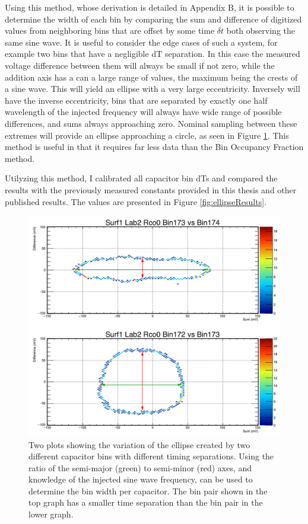 		Using this method, whose derivation is detailed in Appendix B, it is possible to determine the width of each bin by comparing the sum and difference of digitized values from neighboring bins that are offset by some time $\delta t$ both observing the same sine wave.  It is useful to consider the edge cases of such a system, for example two bins that have a negligible dT separation.  In this case the measured voltage difference between them will always be small if not zero, while the addition axis has a can a large range of values, the maximum being the crests of a sine wave. This will yield an ellipse with a very large eccentricity.  Inversely will have the inverse eccentricity, bins that are separated by exactly one half wavelength of the injected frequency will always have wide range of possible differences, and sums always approaching zero.  Nominal sampling between these extremes will provide an ellipse approaching a circle, as seen in Figure \ref{fig:ellipseMethodExample}.  This method is useful in that it requires far less data than the Bin Occupancy Fraction method.  
		
		Utilyzing this method, I calibrated all capacitor bin dTs and compared the results with the previously measured constants provided in this thesis and other published results\cite{BenSThesis}.  The values are presented in Figure \ref{fig:ellipseResults}.
		
	\begin{figure}
		\includegraphics[width=\textwidth]{figures/ellipseMethodExample2_arrows}
		\caption{Two plots showing the variation of the ellipse created by two different capacitor bins with different timing separations.  Using the ratio of the semi-major (green) to semi-minor (red) axes, and knowledge of the injected sine wave frequency, can be used to determine the bin width per capacitor.  The bin pair shown in the top graph has a smaller time separation than the bin pair in the lower graph.}
		\label{fig:ellipseMethodExample}
	\end{figure}

